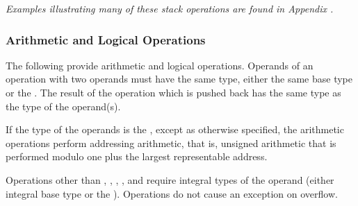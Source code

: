 \textit{Examples illustrating many of these stack operations are
found in Appendix .}

\subsubsection{Arithmetic and Logical Operations} 
The following provide arithmetic and logical operations. 
Operands of an operation with two operands
must have the same type,
either the same base type or the \generictype.
The result of the operation which is pushed back has the same type
as the type of the operand(s).  

If the type of the operands is the \generictype, 
except as otherwise specified, the arithmetic operations
perform addressing arithmetic, that is, unsigned arithmetic that is performed
modulo one plus the largest representable address. 

Operations other than \DWOPabs{},
\DWOPdiv{}, \DWOPminus{}, \DWOPmul{}, \DWOPneg{} and \DWOPplus{} 
require integral types of the operand (either integral base type 
or the \generictype).  Operations do not cause an exception 
on overflow.

